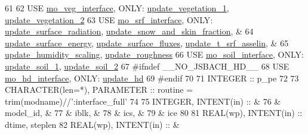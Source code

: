 \begin{DoxyCode}
61 
62     \textcolor{keywordtype}{USE }\hyperlink{namespacemo__veg__interface}{mo\_veg\_interface}\textcolor{keywordtype}{,     ONLY}: \hyperlink{namespacemo__veg__interface_a3663bc9118551ffb7d52763535228d89}{update\_vegetation\_1}, 
      \hyperlink{namespacemo__veg__interface_a58ea81b4305df127f8b495a40b520eae}{update\_vegetation\_2}
63     \textcolor{keywordtype}{USE }\hyperlink{namespacemo__srf__interface}{mo\_srf\_interface}\textcolor{keywordtype}{,     ONLY}: \hyperlink{namespacemo__srf__interface_a137b2fda7589cf50e04e3eaafc16ca43}{update\_surface\_radiation}, 
      \hyperlink{namespacemo__srf__interface_ac20b7f42f80cf50fcae6c709a2c70f8f}{update\_snow\_and\_skin\_fraction}, &
64                                     \hyperlink{namespacemo__srf__interface_a35bdafa30fe0752a3903d61fc30173cf}{update\_surface\_energy}, 
      \hyperlink{namespacemo__srf__interface_acdac2acc6bb50d7ecc7dea28ea5b3e87}{update\_surface\_fluxes}, \hyperlink{namespacemo__srf__interface_a5633e536e2d4fb8351760c1a5c8bf972}{update\_t\_srf\_asselin}, &
65                                     \hyperlink{namespacemo__srf__interface_a5b41ccc70c29c3591021f628805678fa}{update\_humidity\_scaling}, 
      \hyperlink{namespacemo__srf__interface_ae587e1259627bd94efdfc4698cebe49a}{update\_roughness}
66     \textcolor{keywordtype}{USE }\hyperlink{namespacemo__soil__interface}{mo\_soil\_interface}\textcolor{keywordtype}{,    ONLY}: \hyperlink{namespacemo__soil__interface_ae4d0b6e8f65eeda1006776c05f071a85}{update\_soil\_1}, 
      \hyperlink{namespacemo__soil__interface_ac0a837dc7aabd46cf851cef036afaeda}{update\_soil\_2}
67 \textcolor{preprocessor}{#ifndef \_\_NO\_JSBACH\_HD\_\_}
68 \textcolor{preprocessor}{}    \textcolor{keywordtype}{USE }\hyperlink{namespacemo__hd__interface}{mo\_hd\_interface}\textcolor{keywordtype}{,      ONLY}: \hyperlink{namespacemo__hd__interface_a9c78647e6d4247940081f0f4cb58732c}{update\_hd}
69 \textcolor{preprocessor}{#endif}
70 \textcolor{preprocessor}{}
71     \textcolor{keywordtype}{INTEGER} :: p\_pe
72 
73     \textcolor{keywordtype}{CHARACTER(len=*)}, \textcolor{keywordtype}{PARAMETER} :: routine = trim(modname)//\textcolor{stringliteral}{':interface\_full'}
74 
75     \textcolor{keywordtype}{INTEGER}, \textcolor{keywordtype}{INTENT(in)} :: &
76       & model\_id,          &
77       & iblk,              &
78       & ics,               &
79       & ice
80 
81     \textcolor{keywordtype}{REAL(wp)}, \textcolor{keywordtype}{INTENT(in)} :: dtime, steplen
82     \textcolor{keywordtype}{REAL(wp)}, \textcolor{keywordtype}{INTENT(in)} ::   &

\end{DoxyCode}
